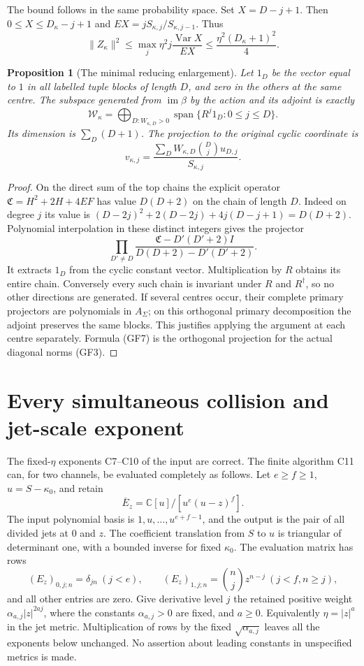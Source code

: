 \documentclass[11pt]{article}
\newcommand{\C}{\mathbb C}\newcommand{\R}{\mathbb R}
\newcommand{\im}{\operatorname{im}}
\newcommand{\Var}{\operatorname{Var}}
\newtheorem{proposition}[theorem]{Proposition}
\begin{document}
The bound follows in the same probability space. Set $X=D-j+1$.
Then $0\le X\le D_\kappa-j+1$ and
$EX=jS_{\kappa,j}/S_{\kappa,j-1}$. Thus
\[
\|Z_\kappa\|^2\le
\max_j\eta^2j\frac{\Var X}{EX}
\le\frac{\eta^2(D_\kappa+1)^2}{4}.
\tag{GF5}
\]

\begin{proposition}[The minimal reducing enlargement]
Let $1_D$ be the vector equal to $1$ in all labelled tuple blocks of
length $D$, and zero in the others at the same centre. The subspace
generated from $\im\beta$ by the action and its adjoint is exactly
\[
\mathscr W_\kappa=
\bigoplus_{D:W_{\kappa,D}>0}\operatorname{span}
\{R^j1_D:0\le j\le D\}.
\tag{GF6}
\]
Its dimension is $\sum_D(D+1)$. The projection to the original cyclic
coordinate is
\[
v_{\kappa,j}=
\frac{\sum_DW_{\kappa,D}\binom Dj u_{D,j}}{S_{\kappa,j}}.
\tag{GF7}
\]
\end{proposition}
\begin{proof}
On the direct sum of the top chains the explicit operator
$\mathfrak C=H^2+2H+4EF$ has value $D(D+2)$ on the chain of length $D$.
Indeed on degree $j$ its value is
$(D-2j)^2+2(D-2j)+4j(D-j+1)=D(D+2)$.
Polynomial interpolation in these distinct integers gives the projector
\[
\prod_{D'\ne D}
\frac{\mathfrak C-D'(D'+2)I}{D(D+2)-D'(D'+2)}.
\]
It extracts $1_D$ from the cyclic constant vector. Multiplication by
$R$ obtains its entire chain. Conversely every such chain is invariant
under $R$ and $R^\dagger$, so no other directions are generated.
If several centres occur, their complete primary projectors are
polynomials in $A_\Sigma$; on this orthogonal primary decomposition
the adjoint preserves the same blocks. This justifies applying the
argument at each centre separately. Formula (GF7) is the orthogonal
projection for the actual diagonal norms (GF3).
\end{proof}

\section{Every simultaneous collision and jet-scale exponent}
The fixed-$\eta$ exponents C7--C10 of the input are correct. The finite
algorithm C11 can, for two channels, be evaluated completely as follows.
Let $e\ge f\ge1$, $u=S-\kappa_0$, and retain
\[
\overline E_z=\C[u]/[u^e(u-z)^f].
\]
The input polynomial basis is $1,u,\ldots,u^{e+f-1}$, and the output
is the pair of all divided jets at $0$ and $z$.
The coefficient translation from $S$ to $u$ is triangular of determinant
one, with a bounded inverse for fixed $\kappa_0$.
The evaluation matrix has rows
\[
(E_z)_{0,j;n}=\delta_{jn}\ (j<e),\qquad
(E_z)_{1,j;n}=\binom nj z^{n-j}\ (j<f,n\ge j),
\tag{GF8}
\]
and all other entries are zero. Give derivative level $j$ the retained
positive weight $\alpha_{a,j}|z|^{2aj}$, where the constants
$\alpha_{a,j}>0$ are fixed, and $a\ge0$. Equivalently
$\eta=|z|^a$ in the jet metric. Multiplication of rows by the fixed
$\sqrt{\alpha_{a,j}}$ leaves all the exponents below unchanged.
No assertion about leading constants in unspecified metrics is made.
\end{document}
